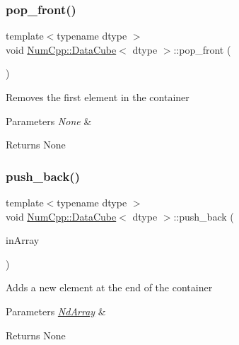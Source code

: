 \subsubsection{\texorpdfstring{pop\+\_\+front()}{pop\_front()}}
{\footnotesize\ttfamily template$<$typename dtype $>$ \\
void \mbox{\hyperlink{class_num_cpp_1_1_data_cube}{Num\+Cpp\+::\+Data\+Cube}}$<$ dtype $>$\+::pop\+\_\+front (\begin{DoxyParamCaption}{ }\end{DoxyParamCaption})\hspace{0.3cm}{\ttfamily [inline]}}

Removes the first element in the container


\begin{DoxyParams}{Parameters}
{\em None} & \\
\hline
\end{DoxyParams}
\begin{DoxyReturn}{Returns}
None 
\end{DoxyReturn}
\mbox{\label{class_num_cpp_1_1_data_cube_a0521c70a8a6cd5fc95faf1c526b7b228}} 
\subsubsection{\texorpdfstring{push\+\_\+back()}{push\_back()}}
{\footnotesize\ttfamily template$<$typename dtype $>$ \\
void \mbox{\hyperlink{class_num_cpp_1_1_data_cube}{Num\+Cpp\+::\+Data\+Cube}}$<$ dtype $>$\+::push\+\_\+back (\begin{DoxyParamCaption}\item[{const \mbox{\hyperlink{class_num_cpp_1_1_nd_array}{Nd\+Array}}$<$ dtype $>$ \&}]{in\+Array }\end{DoxyParamCaption})\hspace{0.3cm}{\ttfamily [inline]}}

Adds a new element at the end of the container


\begin{DoxyParams}{Parameters}
{\em \mbox{\hyperlink{class_num_cpp_1_1_nd_array}{Nd\+Array}}} & \\
\hline
\end{DoxyParams}
\begin{DoxyReturn}{Returns}
None 
\end{DoxyReturn}
\mbox{\label{class_num_cpp_1_1_data_cube_a49c36ab206417ae30908145b4a2a001a}} 
